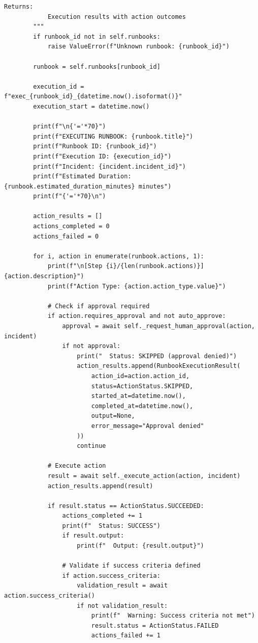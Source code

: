 \begin{lstlisting}[style=python, caption={Runbook automation with guided remediation}]
        Returns:
            Execution results with action outcomes
        """
        if runbook_id not in self.runbooks:
            raise ValueError(f"Unknown runbook: {runbook_id}")

        runbook = self.runbooks[runbook_id]

        execution_id = f"exec_{runbook_id}_{datetime.now().isoformat()}"
        execution_start = datetime.now()

        print(f"\n{'='*70}")
        print(f"EXECUTING RUNBOOK: {runbook.title}")
        print(f"Runbook ID: {runbook_id}")
        print(f"Execution ID: {execution_id}")
        print(f"Incident: {incident.incident_id}")
        print(f"Estimated Duration: {runbook.estimated_duration_minutes} minutes")
        print(f"{'='*70}\n")

        action_results = []
        actions_completed = 0
        actions_failed = 0

        for i, action in enumerate(runbook.actions, 1):
            print(f"\n[Step {i}/{len(runbook.actions)}] {action.description}")
            print(f"Action Type: {action.action_type.value}")

            # Check if approval required
            if action.requires_approval and not auto_approve:
                approval = await self._request_human_approval(action, incident)
                if not approval:
                    print("  Status: SKIPPED (approval denied)")
                    action_results.append(RunbookExecutionResult(
                        action_id=action.action_id,
                        status=ActionStatus.SKIPPED,
                        started_at=datetime.now(),
                        completed_at=datetime.now(),
                        output=None,
                        error_message="Approval denied"
                    ))
                    continue

            # Execute action
            result = await self._execute_action(action, incident)
            action_results.append(result)

            if result.status == ActionStatus.SUCCEEDED:
                actions_completed += 1
                print(f"  Status: SUCCESS")
                if result.output:
                    print(f"  Output: {result.output}")

                # Validate if success criteria defined
                if action.success_criteria:
                    validation_result = await action.success_criteria()
                    if not validation_result:
                        print(f"  Warning: Success criteria not met")
                        result.status = ActionStatus.FAILED
                        actions_failed += 1


\end{lstlisting}
